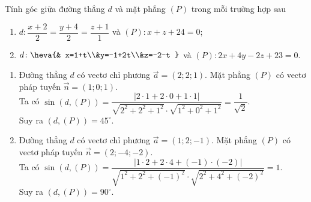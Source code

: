 \begin{vd}%
	Tính góc giữa đường thẳng $d$ và mặt phẳng $(P)$ trong mỗi trường hợp sau
	\begin{enumerate}
		\item $d\colon\dfrac{x+2}{2}=\dfrac{y+4}{2}=\dfrac{z+1}{1}$ và $(P)\colon x+z+24=0$;
		\item $d\colon\heva{& x=1+t\\&y=-1+2t\\&z=-2-t }$ và $(P)\colon 2x+4y-2z+23=0$.
	\end{enumerate}
	\loigiai
	{
		\begin{enumerate}
			\item Đường thẳng $d$ có vectơ chỉ phương $\overrightarrow{a}=(2;2;1)$. Mặt phẳng $(P)$ có vectơ pháp tuyến $\overrightarrow{n}=(1;0;1)$.\\
			Ta có $\sin (d,(P))=\dfrac{\left |2\cdot 1+2\cdot 0+1\cdot 1 \right |}{\sqrt{2^2+2^2+1^2}\cdot\sqrt{1^2+0^2+1^2}}=\dfrac{1}{\sqrt{2}}$.\\
			Suy ra $(d,(P))=45^{\circ}$.
			\item Đường thẳng $d$ có vectơ chỉ phương $\overrightarrow{a}=(1;2;-1)$. Mặt phẳng $(P)$ có vectơ pháp tuyến $\overrightarrow{n}=(2;-4;-2)$.\\
			Ta có $\sin (d,(P))=\dfrac{\left |1\cdot 2+2\cdot 4+(-1)\cdot (-2) \right |}{\sqrt{1^2+2^2+(-1)^2}\cdot\sqrt{2^2+4^2+(-2)^2}}=1$.\\
			Suy ra $(d,(P))=90^{\circ}$.
		\end{enumerate}
	}
\end{vd}

